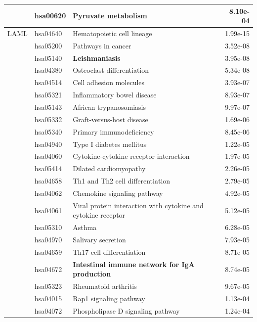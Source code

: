 \begin{longtable}{cllr}
 & hsa00620 & \textcolor{\clrnew}{Pyruvate metabolism} & 8.10e-04 \\ 
\midrule 
LAML & hsa04640 & \textcolor{\clrnew}{Hematopoietic cell lineage} & 1.99e-15\\ 
 & hsa05200 & \textcolor{\clrnew}{Pathways in cancer} & 3.52e-08 \\ 
 \rowcolor{\clrpath}& hsa05140 & \textbf{Leishmaniasis} & 3.95e-08 \\ 
 & hsa04380 & \textcolor{\clrnew}{Osteoclast differentiation} & 5.34e-08 \\ 
 & hsa04514 & \textcolor{\clrnew}{Cell adhesion molecules} & 3.93e-07 \\ 
 & hsa05321 & \textcolor{\clrnew}{Inflammatory bowel disease} & 8.93e-07 \\ 
 & hsa05143 & \textcolor{\clrnew}{African trypanosomiasis} & 9.97e-07 \\ 
 & hsa05332 & \textcolor{\clrnew}{Graft-versus-host disease} & 1.69e-06 \\ 
 & hsa05340 & \textcolor{\clrnew}{Primary immunodeficiency} & 8.45e-06 \\ 
 & hsa04940 & \textcolor{\clrnew}{Type I diabetes mellitus} & 1.22e-05 \\ 
 & hsa04060 & \textcolor{\clrnew}{Cytokine-cytokine receptor interaction} & 1.97e-05 \\ 
 & hsa05414 & \textcolor{\clrnew}{Dilated cardiomyopathy} & 2.26e-05 \\ 
 & hsa04658 & \textcolor{\clrnew}{Th1 and Th2 cell differentiation} & 2.79e-05 \\ 
 & hsa04062 & \textcolor{\clrnew}{Chemokine signaling pathway} & 4.92e-05 \\ 
 & hsa04061 & \textcolor{\clrnew}{Viral protein interaction with cytokine and cytokine receptor} & 5.12e-05 \\ 
 & hsa05310 & \textcolor{\clrnew}{Asthma} & 6.28e-05 \\ 
 & hsa04970 & \textcolor{\clrnew}{Salivary secretion} & 7.93e-05 \\ 
 & hsa04659 & \textcolor{\clrnew}{Th17 cell differentiation} & 8.71e-05 \\ 
 \rowcolor{\clrpath}& hsa04672 & \textbf{Intestinal immune network for IgA production} & 8.74e-05 \\ 
 & hsa05323 & \textcolor{\clrnew}{Rheumatoid arthritis} & 9.67e-05 \\ 
 & hsa04015 & \textcolor{\clrnew}{Rap1 signaling pathway} & 1.13e-04 \\ 
 & hsa04072 & \textcolor{\clrnew}{Phospholipase D signaling pathway} & 1.24e-04 \\ 

\end{longtable}
